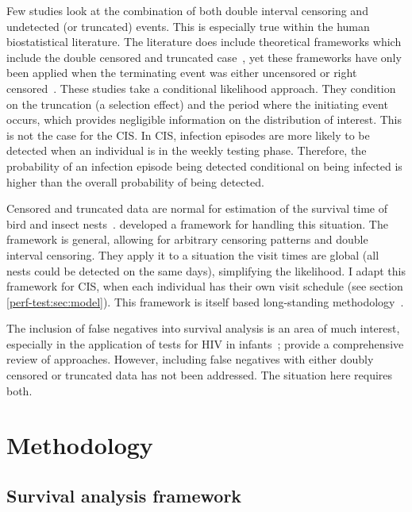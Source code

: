 \documentclass[12pt, letterpaper]{article} %
\begin{document}
Few studies look at the combination of both double interval censoring and undetected (or truncated) events.
This is especially true within the human biostatistical literature.
The literature does include theoretical frameworks which include the double censored and truncated case~\autocite{turnbullEmpirical,dempsterMaximum}, yet these frameworks have only been applied when the terminating event was either uncensored or right censored~\autocite{sunEmpirical,bacchettiNonparametric}.
These studies \autocite[and elsewhere, e.g.:][]{shenNonparametric} take a conditional likelihood approach.
They condition on the truncation (a selection effect) and the period where the initiating event occurs, which provides negligible information on the distribution of interest.
This is not the case for the CIS.
In CIS, infection episodes are more likely to be detected when an individual is in the weekly testing phase.
Therefore, the probability of an infection episode being detected conditional on being infected is higher than the overall probability of being detected.

Censored and truncated data are normal for estimation of the survival time of bird and insect nests~\autocite{heiseyABCs}.
\textcite{heiseyModelling} developed a framework for handling this situation.
The framework is general, allowing for arbitrary censoring patterns and double interval censoring.
They apply it to a situation the visit times are global (all nests could be detected on the same days), simplifying the likelihood.
I adapt this framework for CIS, when each individual has their own visit schedule (see section \cref{perf-test:sec:model}).
This framework is itself based long-standing methodology~\autocite{dempsterMaximum,turnbullEmpirical}.

The inclusion of false negatives into survival analysis is an area of much interest, especially in the application of tests for HIV in infants~\autocite[e.g.][]{brownBayesian,balasubramanianEstimation};
\textcite{piresIntervalMisclassify} provide a comprehensive review of approaches.
However, including false negatives with either doubly censored or truncated data has not been addressed.
The situation here requires both.

\section{Methodology}

\subsection{Survival analysis framework}
\end{document}
